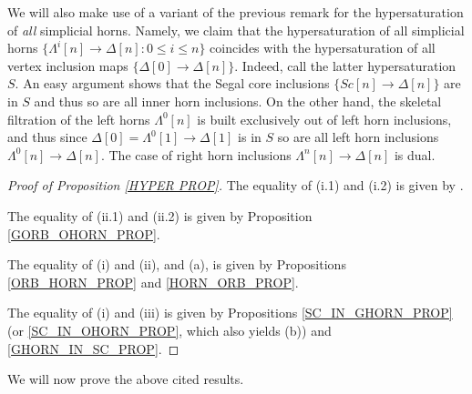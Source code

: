 \documentclass[a4paper,10pt,draft]{article}%
\begin{document}
\begin{remark}\label{HYPERSATKAN REM}
	We will also make use of a variant of the previous remark for the hypersaturation of \textit{all} simplicial horns.
	Namely, we claim that the hypersaturation of all simplicial horns 
	$\{\Lambda^i[n] \to \Delta[n] \colon 0 \leq i \leq n\}$
	coincides with the hypersaturation of all vertex inclusion maps
	$\{\Delta[0] \to \Delta[n]\}$.
	Indeed, call the latter hypersaturation $S$. 
	An easy argument shows that the Segal core inclusions 
	$\{Sc[n] \to \Delta[n]\}$ are in $S$ and thus so are all inner horn inclusions. On the other hand, the skeletal filtration of the left horns $\Lambda^0[n]$ is built exclusively out of left horn inclusions, and thus since $\Delta[0]=\Lambda^0[1] \to \Delta[1]$ is in $S$ so are all left horn inclusions 
	$\Lambda^0[n] \to \Delta[n]$. The case of right horn inclusions $\Lambda^n[n] \to \Delta[n]$ is dual.
\end{remark}


\begin{proof}[Proof of Proposition \ref{HYPER PROP}]
      The equality of (i.1) and (i.2) is given by \cite[Proposition 6.17]{Per17}.
      
      The equality of (ii.1) and (ii.2) is given by Proposition \ref{GORB_OHORN_PROP}.

      The equality of (i) and (ii), and (a), is given by Propositions \ref{ORB_HORN_PROP} and \ref{HORN_ORB_PROP}.

      The equality of (i) and (iii) is given by Propositions \ref{SC_IN_GHORN_PROP}
      (or \ref{SC_IN_OHORN_PROP}, which also yields (b)) and \ref{GHORN_IN_SC_PROP}.
\end{proof}

We will now prove the above cited results.
\end{document}
